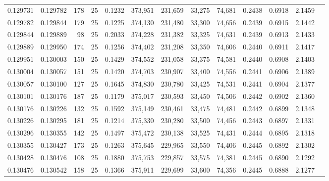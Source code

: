 \begin{tabular}{rrrrrrrrrrrrr}
0.129731 & 0.129782 &   178 &  25 &                                     0.1232 & 373,951 & 231,659 &  33,275 &  74,681 & 0.2438 & 0.6918 & 2.1459 \\
0.129782 & 0.129844 &   179 &  25 &                                     0.1225 & 374,130 & 231,480 &  33,300 &  74,656 & 0.2439 & 0.6915 & 2.1442 \\
0.129844 & 0.129889 &    98 &  25 &                                     0.2033 & 374,228 & 231,382 &  33,325 &  74,631 & 0.2439 & 0.6913 & 2.1433 \\
0.129889 & 0.129950 &   174 &  25 &                                     0.1256 & 374,402 & 231,208 &  33,350 &  74,606 & 0.2440 & 0.6911 & 2.1417 \\
0.129951 & 0.130003 &   150 &  25 &                                     0.1429 & 374,552 & 231,058 &  33,375 &  74,581 & 0.2440 & 0.6908 & 2.1403 \\
0.130004 & 0.130057 &   151 &  25 &                                     0.1420 & 374,703 & 230,907 &  33,400 &  74,556 & 0.2441 & 0.6906 & 2.1389 \\
0.130057 & 0.130100 &   127 &  25 &                                     0.1645 & 374,830 & 230,780 &  33,425 &  74,531 & 0.2441 & 0.6904 & 2.1377 \\
0.130101 & 0.130176 &   187 &  25 &                                     0.1179 & 375,017 & 230,593 &  33,450 &  74,506 & 0.2442 & 0.6902 & 2.1360 \\
0.130176 & 0.130226 &   132 &  25 &                                     0.1592 & 375,149 & 230,461 &  33,475 &  74,481 & 0.2442 & 0.6899 & 2.1348 \\
0.130226 & 0.130295 &   181 &  25 &                                     0.1214 & 375,330 & 230,280 &  33,500 &  74,456 & 0.2443 & 0.6897 & 2.1331 \\
0.130296 & 0.130355 &   142 &  25 &                                     0.1497 & 375,472 & 230,138 &  33,525 &  74,431 & 0.2444 & 0.6895 & 2.1318 \\
0.130355 & 0.130427 &   173 &  25 &                                     0.1263 & 375,645 & 229,965 &  33,550 &  74,406 & 0.2445 & 0.6892 & 2.1302 \\
0.130428 & 0.130476 &   108 &  25 &                                     0.1880 & 375,753 & 229,857 &  33,575 &  74,381 & 0.2445 & 0.6890 & 2.1292 \\
0.130476 & 0.130542 &   158 &  25 &                                     0.1366 & 375,911 & 229,699 &  33,600 &  74,356 & 0.2445 & 0.6888 & 2.1277 \\

\end{tabular}
